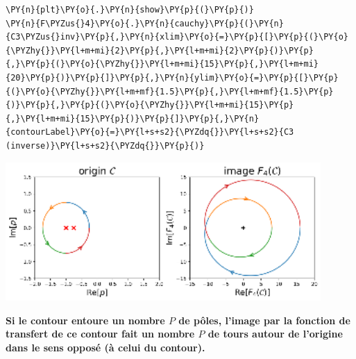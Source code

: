 \begin{tcolorbox}[breakable, size=fbox, boxrule=1pt, pad at break*=1mm,colback=cellbackground, colframe=cellborder]
\begin{Verbatim}[commandchars=\\\{\}]
\PY{n}{plt}\PY{o}{.}\PY{n}{show}\PY{p}{(}\PY{p}{)}
\PY{n}{F\PYZus{}4}\PY{o}{.}\PY{n}{cauchy}\PY{p}{(}\PY{n}{C3\PYZus{}inv}\PY{p}{,}\PY{n}{xlim}\PY{o}{=}\PY{p}{[}\PY{p}{(}\PY{o}{\PYZhy{}}\PY{l+m+mi}{2}\PY{p}{,}\PY{l+m+mi}{2}\PY{p}{)}\PY{p}{,}\PY{p}{(}\PY{o}{\PYZhy{}}\PY{l+m+mi}{15}\PY{p}{,}\PY{l+m+mi}{20}\PY{p}{)}\PY{p}{]}\PY{p}{,}\PY{n}{ylim}\PY{o}{=}\PY{p}{[}\PY{p}{(}\PY{o}{\PYZhy{}}\PY{l+m+mf}{1.5}\PY{p}{,}\PY{l+m+mf}{1.5}\PY{p}{)}\PY{p}{,}\PY{p}{(}\PY{o}{\PYZhy{}}\PY{l+m+mi}{15}\PY{p}{,}\PY{l+m+mi}{15}\PY{p}{)}\PY{p}{]}\PY{p}{,}\PY{n}{contourLabel}\PY{o}{=}\PY{l+s+s2}{\PYZdq{}}\PY{l+s+s2}{C3 (inverse)}\PY{l+s+s2}{\PYZdq{}}\PY{p}{)}
\end{Verbatim}
\end{tcolorbox}
\begin{center}
    \includegraphics[width=0.9\textwidth]{notebook/fig/output_43_1.eps}
\end{center}
\textbf{Si le contour entoure un nombre \(P\) de pôles, l'image par la
fonction de transfert de ce contour fait un nombre \(P\) de tours autour
de l'origine dans le sens opposé (à celui du contour).} 
